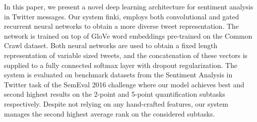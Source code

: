 In this paper, we present a novel deep learning architecture for sentiment analysis in Twitter messages. Our system finki, employs both convolutional and gated recurrent neural networks to obtain a more diverse tweet representation. The network is trained on top of GloVe word embeddings pre-trained on the Common Crawl dataset. Both neural networks are used to obtain a fixed length representation of variable sized tweets, and the concatenation of these vectors is supplied to a fully connected softmax layer with dropout regularization. The system is evaluated on benchmark datasets from the Sentiment Analysis in Twitter task of the SemEval 2016 challenge where our model achieves best and second highest results on the 2-point and 5-point quantification subtasks respectively. Despite not relying on any hand-crafted features, our system manages the second highest average rank on the considered subtasks.
